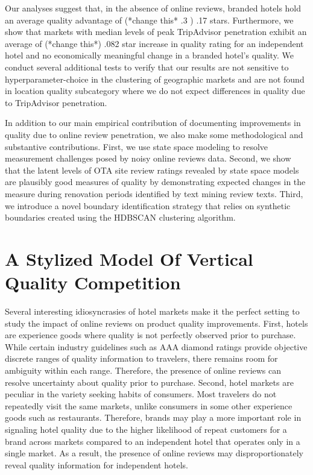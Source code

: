 \documentclass[mksc,blindrev]{informs3} %
\begin{document}
Our analyses suggest that, in the absence of online reviews, branded hotels hold an average quality advantage of (*change this* .3 ) .17 stars. Furthermore, we show that markets with median levels of peak TripAdvisor penetration exhibit an average of (*change this*) .082 star increase in quality rating for an independent hotel and no economically meaningful change in a branded hotel's quality. We conduct several additional tests to verify that our results are not sensitive to hyperparameter-choice in the clustering of geographic markets and are not found in location quality subcategory where we do not expect differences in quality due to TripAdvisor penetration.

In addition to our main empirical contribution of documenting improvements in quality due to online review penetration, we also make some methodological and substantive contributions. First, we use state space modeling to resolve measurement challenges posed by noisy online reviews data. Second, we show that the latent levels of OTA site review ratings revealed by state space models are plausibly good measures of quality by demonstrating expected changes in the measure during renovation periods identified by text mining review texts. Third, we introduce a novel boundary identification strategy that relies on synthetic boundaries created using the HDBSCAN clustering algorithm. 




\section{A Stylized Model Of Vertical Quality Competition} \label{sec:theory}

Several interesting idiosyncrasies of hotel markets make it the perfect setting to study the impact of online reviews on product quality improvements. First, hotels are experience goods where quality is not perfectly observed prior to purchase. While certain industry guidelines such as AAA diamond ratings provide objective discrete ranges of quality information to travelers, there remains room for ambiguity within each range. Therefore, the presence of online reviews can resolve uncertainty about quality prior to purchase. Second, hotel markets are peculiar in the variety seeking habits of consumers. Most travelers do not repeatedly visit the same markets, unlike consumers in some other experience goods such as restaurants. Therefore, brands may play a more important role in signaling hotel quality due to the higher likelihood of repeat customers for a brand across markets compared to an independent hotel that operates only in a single market. As a result, the presence of online reviews may disproportionately reveal quality information for independent hotels.
\end{document}
